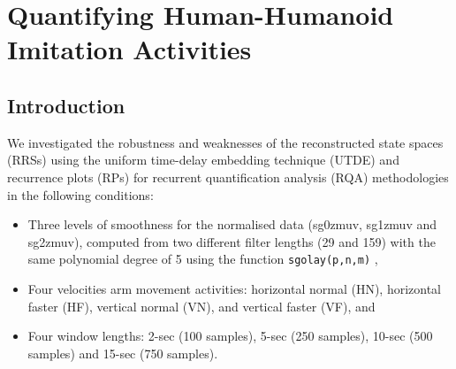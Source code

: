 
\chapter{Quantifying Human-Humanoid Imitation Activities} \label{chapter7}
%
\graphicspath{{figs/chapter6/PDF/}}


%
%


\section{Introduction} 

We investigated the robustness and weaknesses of the reconstructed 
state spaces (RRSs) using the uniform time-delay embedding technique (UTDE) 
and recurrence plots (RPs) for recurrent quantification analysis (RQA) 
methodologies in the following conditions: 
\begin{itemize}

\item Three levels of smoothness for the normalised data 
(sg0zmuv, sg1zmuv and sg2zmuv), computed from two different filter 
lengths (29 and 159) with the same polynomial degree of 5 using the 
function \texttt{sgolay(p,n,m)} \cite{Rsignal},

\item Four velocities arm movement activities: horizontal normal (HN), 
	horizontal faster (HF), vertical normal (VN), and 
	vertical faster (VF), and
\item Four window lengths: 2-sec (100 samples), 5-sec (250 samples), 
	10-sec (500 samples) and 15-sec (750 samples).
\end{itemize}

